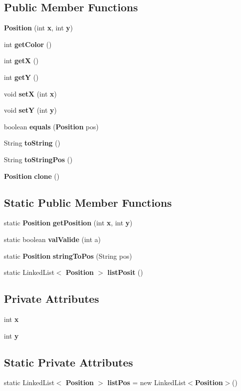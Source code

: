 \subsection*{Public Member Functions}
\begin{DoxyCompactItemize}
\item 
{\bf Position} (int {\bf x}, int {\bf y})
\item 
int {\bf get\-Color} ()
\item 
int {\bf get\-X} ()
\item 
int {\bf get\-Y} ()
\item 
void {\bf set\-X} (int {\bf x})
\item 
void {\bf set\-Y} (int {\bf y})
\item 
boolean {\bf equals} ({\bf Position} pos)
\item 
String {\bf to\-String} ()
\item 
String {\bf to\-String\-Pos} ()
\item 
{\bf Position} {\bf clone} ()
\end{DoxyCompactItemize}
\subsection*{Static Public Member Functions}
\begin{DoxyCompactItemize}
\item 
static {\bf Position} {\bf get\-Position} (int {\bf x}, int {\bf y})
\item 
static boolean {\bf val\-Valide} (int a)
\item 
static {\bf Position} {\bf string\-To\-Pos} (String pos)
\item 
static Linked\-List$<$ {\bf Position} $>$ {\bf list\-Posit} ()
\end{DoxyCompactItemize}
\subsection*{Private Attributes}
\begin{DoxyCompactItemize}
\item 
int {\bf x}
\item 
int {\bf y}
\end{DoxyCompactItemize}
\subsection*{Static Private Attributes}
\begin{DoxyCompactItemize}
\item 
static Linked\-List$<$ {\bf Position} $>$ {\bf list\-Pos} = new Linked\-List$<${\bf Position}$>$()
\end{DoxyCompactItemize}


